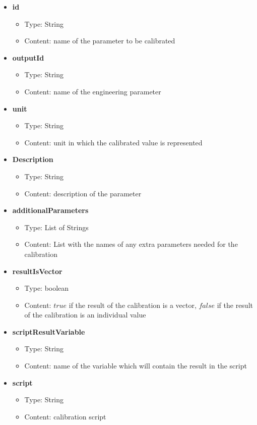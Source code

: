 \begin{itemize}

	\item \textbf{id}
		\begin{itemize}
			\item Type: String
			\item Content: name of the parameter to be calibrated
		\end{itemize}
	\item \textbf{outputId}
		\begin{itemize}
			\item Type: String
			\item Content: name of the engineering parameter
		\end{itemize}
	\item \textbf{unit}
		\begin{itemize}
			\item Type: String
			\item Content: unit in which the calibrated value is represented
		\end{itemize}
	\item \textbf{Description}
		\begin{itemize}
			\item Type: String
			\item Content: description of the parameter
		\end{itemize}
	
	\item \textbf{additionalParameters}
		\begin{itemize}
			\item Type: List of Strings
			\item Content: List with the names of any extra parameters needed for the calibration
		\end{itemize}
	\item \textbf{resultIsVector}
		\begin{itemize}
			\item Type: boolean
			\item Content: $true$ if the result of the calibration is a vector, $false$ if the result of the calibration is an individual value 
		\end{itemize}
	\item \textbf{scriptResultVariable}
		\begin{itemize}
			\item Type: String
			\item Content: name of the variable which will contain the result in the script
		\end{itemize}
	\item \textbf{script}
		\begin{itemize}
			\item Type: String
			\item Content: calibration script
		\end{itemize}						
		
\end{itemize}

